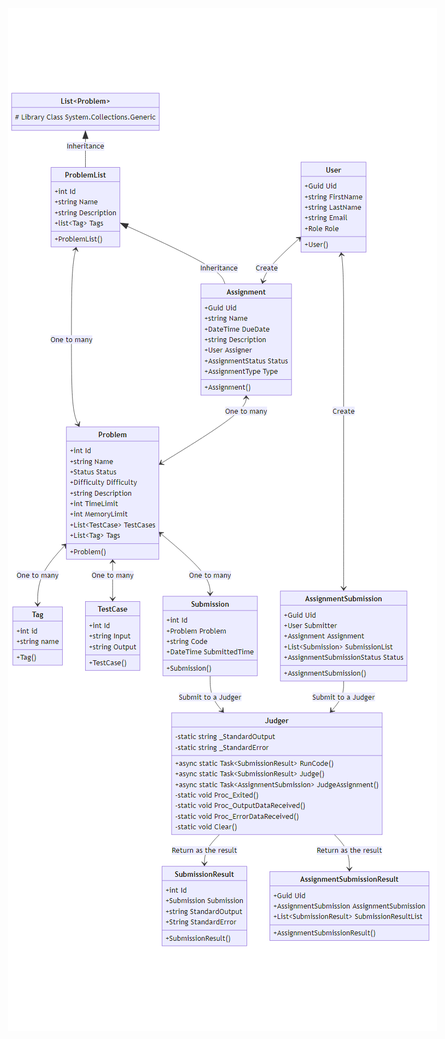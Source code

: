 \documentclass[a4paper]{report}
\begin{document}
\includegraphics[width=\textwidth, height=\textheight, keepaspectratio]{classDiagram}
\end{document}

